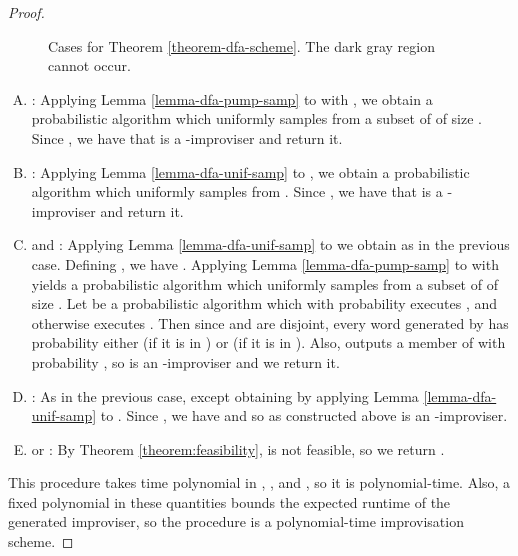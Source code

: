 \documentclass[a4paper,USenglish,numberwithinsect]{lipics}
\theoremstyle{plain}
\theoremstyle{definition}
\begin{document}
\begin{proof}
{\begin{figure}
\caption{Cases for Theorem \ref{theorem-dfa-scheme}. The dark gray
region cannot occur.}
\label{figure-proof-cases}
\end{figure}
}

\begin{enumerate}[(A)]
\item \label{case:pump-v} : Applying Lemma
\ref{lemma-dfa-pump-samp} to  with , we obtain a probabilistic algorithm  which uniformly samples from a
subset of  of size
. Since , we have that  is
a -improviser and return it. 

\item \label{case:unif-v} : Applying Lemma \ref{lemma-dfa-unif-samp} to , we obtain a probabilistic algorithm  which uniformly samples from . Since , we have that  is a -improviser and return it.

\item \label{case:pump-i-unif-v}  and : Applying Lemma \ref{lemma-dfa-unif-samp} to  we obtain  as in the previous case. Defining , we have . Applying Lemma \ref{lemma-dfa-pump-samp} to  with  yields a probabilistic algorithm  which uniformly samples from a subset of  of size . Let  be a probabilistic algorithm which with probability  executes , and otherwise executes . Then since  and  are disjoint, every word generated by  has probability either  (if it is in ) or  (if it is in ). Also,  outputs a member of  with probability , so  is an -improviser and we return it.

\item \label{case:unif-i-unif-v} : As in the previous case, except obtaining  by applying Lemma \ref{lemma-dfa-unif-samp} to . Since , we have  and so  as constructed above is an -improviser.

\item \label{case:infeasible}  or : By Theorem \ref{theorem:feasibility},  is not feasible, so we return .
\end{enumerate}

This procedure takes time polynomial in , , and , so it is polynomial-time. Also, a fixed polynomial in these quantities bounds the expected runtime of the generated improviser, so the procedure is a polynomial-time improvisation scheme.
\end{proof}
\end{document}
